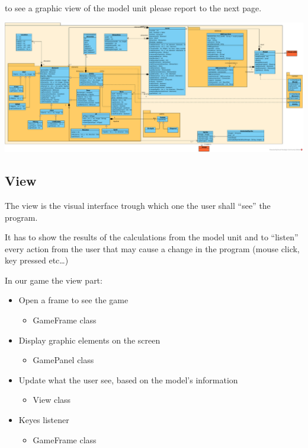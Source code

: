 \documentclass{report}
\begin{document}
to see a graphic view of the model unit please report to the next page.

\begin{landscape}

\vspace*{\fill}

\includegraphics[scale=0.39]{resources/SVG/model.pdf}

\vspace*{\fill}

\end{landscape}

\subsection{View}

The view is the visual interface trough which one the user shall “see” the program.

It has to show the results of the calculations from the model unit and to “listen” every action from the user that may cause a change in the program (mouse click, key pressed etc…) 

In our game the view part:
\begin{itemize}
\item Open a frame to see the game
	\begin{itemize}
	\item GameFrame class
	\end{itemize}
\item Display graphic elements on the screen
	\begin{itemize}
	\item GamePanel class
	\end{itemize}
\item Update what the user see, based on the model’s information
	\begin{itemize}
	\item View class
	\end{itemize}
\item Keyes listener
	\begin{itemize}
	\item GameFrame class
	\end{itemize}
\end{itemize}
\end{document}
